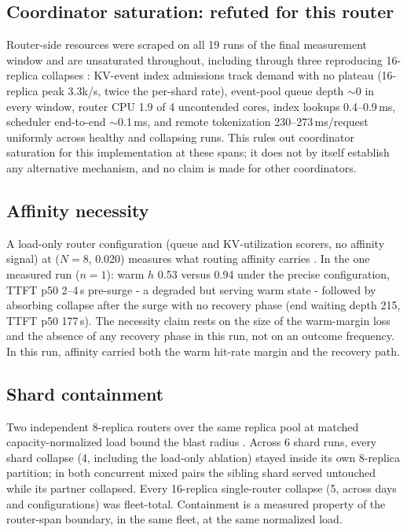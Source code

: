 \subsection{Coordinator saturation: refuted for this router}
\label{sec:coordinator}

Router-side resources were scraped on all 19 runs of the final
measurement window and are unsaturated throughout, including through
three reproducing 16-replica collapses : KV-event index
admissions track demand with no plateau (16-replica peak 3.3k/s,
twice the per-shard rate), event-pool queue depth $\sim$0 in every
window, router CPU 1.9 of 4 uncontended cores, index lookups
0.4--0.9\,ms, scheduler end-to-end $\sim$0.1\,ms, and remote tokenization
230--273\,ms/request uniformly across healthy and collapsing runs.
This rules out coordinator saturation for this implementation at
these spans; it does not by itself establish any alternative
mechanism, and no claim is made for other coordinators.

\subsection{Affinity necessity}
\label{sec:affinity}

A load-only router configuration (queue and KV-utilization scorers,
no affinity signal) at ($N{=}8$, 0.020) measures what routing affinity
carries . In the one measured run ($n=1$): warm $h$ 0.53 versus
0.94 under the precise configuration, TTFT p50 2--4\,s pre-surge - a
degraded but serving warm state - followed by absorbing collapse
after the surge with no recovery phase (end waiting depth 215, TTFT
p50 177\,s). The necessity claim rests on the size of the warm-margin
loss and the absence of any recovery phase in this run, not on an
outcome frequency. In this run, affinity carried both the warm
hit-rate margin and the recovery path.

\subsection{Shard containment}
\label{sec:shards}

Two independent 8-replica routers over the same replica pool at
matched capacity-normalized load bound the blast radius .
Across 6 shard runs, every shard collapse (4, including the
load-only ablation) stayed inside its own 8-replica partition; in
both concurrent mixed pairs the sibling shard served untouched while
its partner collapsed. Every 16-replica single-router collapse (5,
across days and configurations) was fleet-total. Containment is a
measured property of the router-span boundary, in the same fleet, at
the same normalized load.

